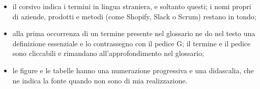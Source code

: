 \begin{itemize}
        \item il corsivo indica i termini in lingua straniera, e soltanto questi; i nomi propri di
	aziende, prodotti e metodi (come Shopify, Slack o Scrum) restano in tondo;
        \item alla prima occorrenza di un termine presente nel glossario ne do nel testo una
	definizione essenziale e lo contrassegno con il pedice G; il termine e il pedice sono cliccabili e
	rimandano all’approfondimento nel glossario;
        \item le figure e le tabelle hanno una numerazione progressiva e una didascalia, che ne
	indica la fonte quando non sono di mia realizzazione.
\end{itemize}
